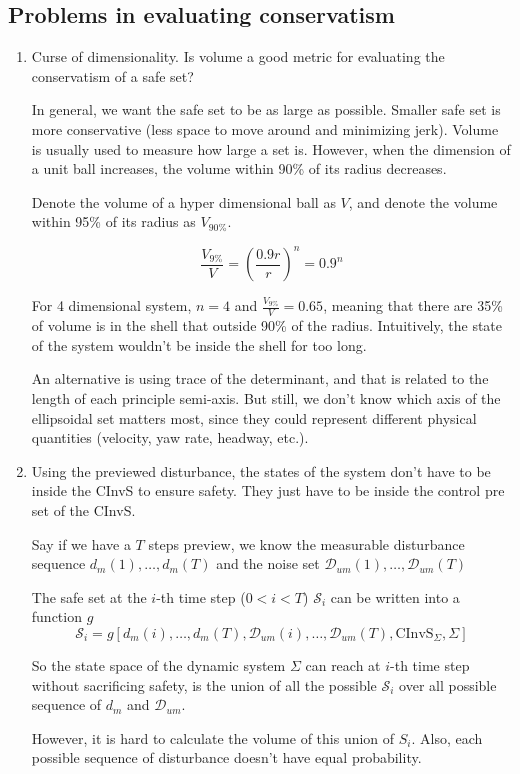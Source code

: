 \documentclass{article}
\begin{document}
\subsection{Problems in evaluating conservatism}
\begin{enumerate}
	\item Curse of dimensionality. Is volume a good metric for evaluating the conservatism of a safe set?
	
	In general, we want the safe set to be as large as possible. Smaller safe set is more conservative (less space to move around and minimizing jerk). Volume is usually used to measure how large a set is. However, when the dimension of a unit ball increases, the volume within 90\% of its radius decreases.
	
	Denote the volume of a hyper dimensional ball as $V$, and denote the volume within 95\% of its radius as $V_{90\%}$.
	
	$$
	\frac{V_{9\%}}{V} = \left(\frac{0.9r}{r}\right)^n = 0.9^n
	$$
	
	For 4 dimensional system, $n=4$ and  $\frac{V_{9\%}}{V} = 0.65$, meaning that there are 35\% of volume is in the shell that outside 90\% of the radius. Intuitively, the state of the system wouldn't be inside the shell for too long.
	
	An alternative is using trace of the determinant, and that is related to the length of each principle semi-axis. But still, we don't know which axis of the ellipsoidal set matters most, since they could represent different physical quantities (velocity, yaw rate, headway, etc.).
	
	\item Using the previewed disturbance, the states of the system don't have to be inside the CInvS to ensure safety. They just have to be inside the control pre set of the CInvS. 
	
	Say if we have a $T$ steps preview, we know the measurable disturbance sequence $d_m(1), \dots, d_m(T)$ and the noise set $\mathcal D_{um}(1), \dots, \mathcal D_{um}(T)$
	
	The safe set at the $i$-th time step ($0 < i < T$) $\mathcal S_i$ can be written into a function $g$
	$$
	\mathcal S_i = g[d_m(i), \dots, d_m(T), \mathcal D_{um}(i), \dots, \mathcal D_{um}(T), \text{CInvS}_\Sigma, \Sigma]
	$$
	
	So the state space of the dynamic system $\Sigma$ can reach at $i$-th time step without sacrificing safety, is the union of all the possible $\mathcal S_i$ over all possible sequence of $d_m$ and $\mathcal D_{um}$. 
	
	However, it is hard to calculate the volume of this union of $S_i$. Also, each possible sequence of disturbance doesn't have equal probability.
	
\end{enumerate}
\end{document}
